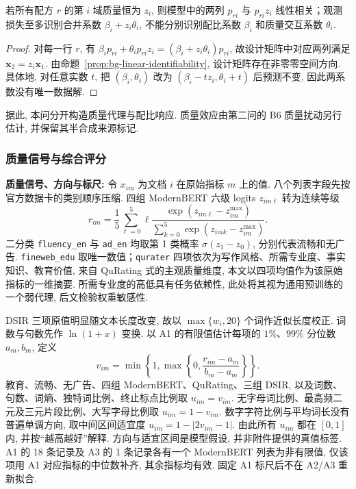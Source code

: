 \begin{proposition}\label{prop:q1-quality-collinearity-v15}
若所有配方 $r$ 的第 $i$ 域质量恒为 $z_i$, 则模型中的两列 $p_{ri}$ 与 $p_{ri}z_i$ 线性相关；观测损失至多识别合并系数 $\beta_i+z_i\theta_i$, 不能分别识别配比系数 $\beta_i$ 和质量交互系数 $\theta_i$. 
\end{proposition}
\begin{proof}
对每一行 $r$, 有 $\beta_i p_{ri}+\theta_i p_{ri}z_i=(\beta_i+z_i\theta_i)p_{ri}$, 故设计矩阵中对应两列满足 $\mathbf x_2=z_i\mathbf x_1$. 由命题~\ref{prop:bg-linear-identifiability}, 设计矩阵存在非零零空间方向. 具体地, 对任意实数 $t$, 把 $(\beta_i, \theta_i)$ 改为 $(\beta_i-tz_i, \theta_i+t)$ 后预测不变, 因此两系数没有唯一数据解. 
\end{proof}
据此, 本问分开构造质量代理与配比响应. 质量效应由第二问的 B6 质量扰动另行估计, 并保留其半合成来源标记. 

\subsubsection{质量信号与综合评分}

\textbf{质量信号、方向与标尺: }
令 $x_{im}$ 为文档 $i$ 在原始指标 $m$ 上的值. 八个列表字段先按官方数据卡的类别顺序压缩\cite{metacard, metarater}. 四组 ModernBERT 六级 logits $z_{im\ell}$ 转为连续等级
\begin{equation}\label{eq:logit}
    r_{im}=\frac{1}{5}\sum_{\ell=0}^{5}\ell
    \frac{\exp(z_{im\ell}-z_{im}^{\max})}{\sum_{k=0}^{5}\exp(z_{imk}-z_{im}^{\max})}.
\end{equation}
二分类 \texttt{fluency\_en} 与 \texttt{ad\_en} 均取第 1 类概率 $\sigma(z_1-z_0)$, 分别代表流畅和无广告. \texttt{fineweb\_edu} 取唯一数值；\texttt{qurater} 四项依次为写作风格、所需专业度、事实知识、教育价值, 来自 QuRating 式的主观质量维度\cite{qurating}, 本文以四项均值作为该原始指标的一维摘要. 所需专业度的高低具有任务依赖性, 此处将其视为通用预训练的一个弱代理, 后文检验权重敏感性. 

DSIR 三项原值明显随文本长度改变, 故以 $\max\{w_i, 20\}$ 个词作近似长度校正. 词数与句数先作 $\ln(1+x)$ 变换. 以 A1 的有限值估计每项的 $1\%$、$99\%$ 分位数 $a_m, b_m$, 定义
\begin{equation}\label{eq:normalize}
    v_{im}=\min\!\left\{1,  \max\!\left\{0,  \frac{r_{im}-a_m}{b_m-a_m}\right\}\right\}.
\end{equation}
教育、流畅、无广告、四组 ModernBERT、QuRating、三组 DSIR,  以及词数、句数、词熵、独特词比例、终止标点比例取 $u_{im}=v_{im}$. 无字母词比例、最高频二元及三元片段比例、大写字母比例取 $u_{im}=1-v_{im}$. 数字字符比例与平均词长没有普遍单调方向,  取中间区间适宜度 $u_{im}=1-|2v_{im}-1|$. 由此所有 $u_{im}$ 都在 $[0, 1]$ 内, 并按``越高越好''解释. 方向与适宜区间是模型假设, 并非附件提供的真值标签. A1 的 18 条记录及 A3 的 1 条记录各有一个 ModernBERT 列表为非有限值, 仅该项用 A1 对应指标的中位数补齐, 其余指标均有效. 固定 A1 标尺后不在 A2/A3 重新拟合. 


